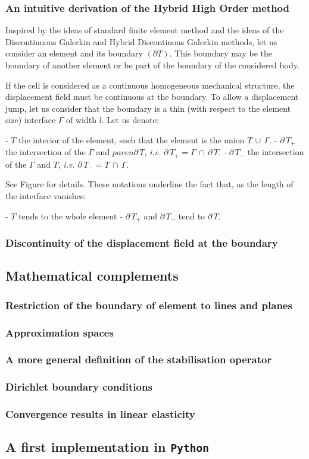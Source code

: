 \subsubsection{An intuitive derivation of the Hybrid High Order method}

Inspired by the ideas of standard finite element method and the ideas of
the Discontinuous Galerkin and Hybrid Discontinous Galerkin methods, let
us consider an element and its boundary $(\partial T)$. This
boundary may be the boundary of another element or be part of the
boundary of the considered body.

If the cell is considered as a continuous homogeneous mechanical
structure, the displacement field must be continuous at the boundary. To
allow a displacement jump, let us consider that the boundary is a thin
(with respect to the element size) interface $\Gamma$ of width $l$.
Let us denote:

- $T$ the interior of the element, such that the element is the union
  $T\,\cup\,\Gamma$.
- $\partial\,T_{+}$ the intersection of the $\Gamma$ and
  $paren{\partial\,T}$, \textit{i.e.}
  $\partial\,T_{+}=\Gamma\,\cap\,\partial\,T$.
- $\partial\,T_{-}$ the intersection of the $\Gamma$ and $T$, \textit{i.e.}
  $\partial\,T_{-}=T\,\cap\,\Gamma$.

See Figure for details. These notations underline the fact that, as
the length of the interface vanishes:

- $T$ tends to the whole element 
- $\partial\,T_{+}$ and $\partial\,T_{-}$ tend to $\partial\,T$.

\subsubsection{Discontinuity of the displacement field at the boundary}

\subsection{Mathematical complements}
\label{mathematical_complements}

\subsubsection{Restriction of the boundary of element to lines and planes}

\subsubsection{Approximation spaces}

\subsubsection{A more general definition of the stabilisation operator}

\subsubsection{Dirichlet boundary conditions}

\subsubsection{Convergence results in linear elasticity}

\subsection{A first implementation in \texttt{Python}}